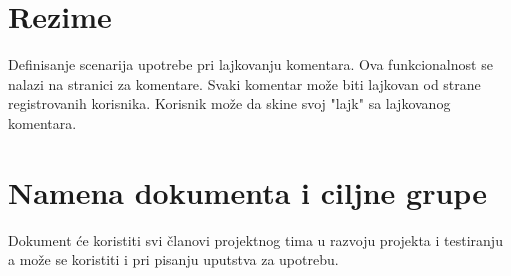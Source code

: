 \section{Rezime}
Definisanje scenarija upotrebe pri lajkovanju komentara. Ova funkcionalnost se nalazi na stranici za komentare. Svaki komentar može biti lajkovan od strane registrovanih korisnika. Korisnik može da skine svoj "lajk" sa lajkovanog komentara.
\section{Namena dokumenta i ciljne grupe}
Dokument će koristiti svi članovi projektnog tima u razvoju projekta i testiranju a može se koristiti i pri pisanju uputstva za upotrebu.